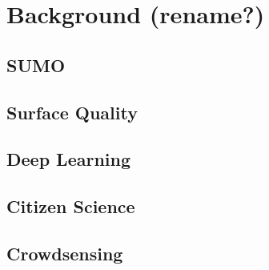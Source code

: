 \cleardoublepage
\chapter{Background (rename?)}
\label{cha:background}

\section{SUMO}
\label{sec:sumo}

\section{Surface Quality}
\label{sec:surface_quality}

\section{Deep Learning}
\label{sec:deep_learning}

\section{Citizen Science}
\label{sec:citizen_science}

\section{Crowdsensing}
\label{sec:crowdsensing}
